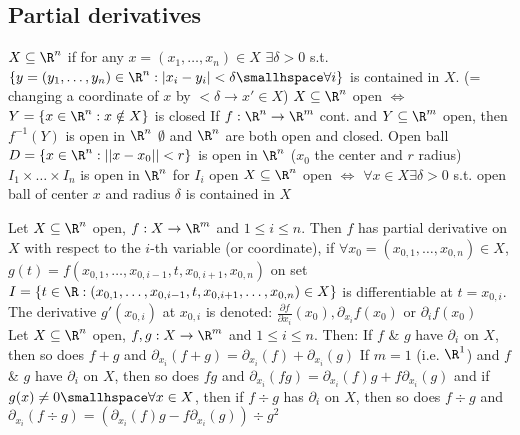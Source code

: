 \newsectionNoPB
\subsection{Partial derivatives}
\shortdef $X \subseteq \R^n$  if for any $x = (x_1, \ldots, x_n) \in X$ $\exists \delta > 0$ s.t.
$\{ y = (y_1, \ldots, y_n) \in \R^n : |x_i - y_i| < \delta \smallhspace \forall i \}$ is contained in $X$.
(= changing a coordinate of $x$ by $< \delta \rightarrow x' \in X$)
\shortproposition $X \subseteq \R^n$ open $\Leftrightarrow$  $Y = \{ x \in \R^n : x \notin X \}$ is closed
\shortcorollary If $f: \R^n \rightarrow \R^m$ cont. and $Y \subseteq \R^m$ open, then $f^{-1}(Y)$ is open in $\R^n$
\shortex {} $\emptyset$ and $\R^n$ are both open and closed.
 Open ball $D = \{ x \in \R^n : ||x - x_0|| < r \}$ is open in $\R^n$ ($x_0$ the center and $r$ radius)
 $I_1 \times \dots \times I_n$ is open in $\R^n$ for $I_i$ open
 $X \subseteq \R^n$ open $\Leftrightarrow$ $\forall x \in X \exists \delta > 0$ s.t. open ball of center $x$ and radius $\delta$ is contained in $X$

 Let $X \subseteq \R^n$ open, $f: X \rightarrow \R^m$ and $1 \leq i \leq n$.
Then $f$ has partial derivative on $X$ with respect to the $i$-th variable (or coordinate),
if $\forall x_0 = (x_{0, 1}, \ldots, x_{0, n}) \in X$, $g(t) = f(x_{0, 1}, \ldots, x_{0, i - 1}, t, x_{0, i + 1}, x_{0, n})$ on set
$I = \{ t \in \R : (x_{0, 1}, \ldots, x_{0, i - 1}, t, x_{0, i + 1}, \ldots, x_{0, n}) \in X \}$ is differentiable at $t = x_{0, i}$.
The derivative $g'(x_{0, i})$ at $x_{0, i}$ is denoted:
$\frac{\partial f}{\partial x_i}(x_0), \partial_{x_i} f(x_0) \text{ or } \partial_i f(x_0)$\\
%
\shortproposition Let $X \subseteq \R^n$ open, $f, g : X \rightarrow \R^m$ and $1 \leq i \leq n$. Then:
 If $f$ \& $g$ have $\partial_i$ on $X$, then so does $f + g$ and $\partial_{x_i} (f + g) = \partial_{x_i}(f) + \partial_{x_i}(g)$
 If $m = 1$ (i.e. $\R^1$) and $f$ \& $g$ have $\partial_i$ on $X$, then so does $fg$ and $\partial_{x_i} (fg) = \partial_{x_i}(f)g + f \partial_{x_i}(g)$
and if $g(x) \neq 0 \smallhspace \forall x \in X$, then if $f \div g$ has $\partial_i$ on $X$, then so does $f \div g$ and
$\partial_{x_i}(f \div g) = (\partial_{x_i}(f) g - f \partial_{x_i}(g)) \div g^2$
